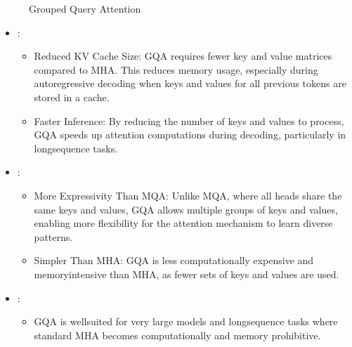 \documentclass[letterpaper,11pt,english]{sphinxmanual}
\begin{document}
\begin{figure}[htbp]
\centering
\capstart

\noindent{}
\caption{Grouped Query Attention}\label{\detokenize{pretraining:id21}}\end{figure}

\sphinxAtStartPar
{}
\begin{itemize}
\item {} 
\sphinxAtStartPar
{}:
\begin{itemize}
\item {} 
\sphinxAtStartPar
Reduced KV Cache Size: GQA requires fewer key and value matrices
compared to MHA. This reduces memory usage, especially during
autoregressive decoding when keys and values for all previous tokens
are stored in a cache.

\item {} 
\sphinxAtStartPar
Faster Inference: By reducing the number of keys and values to
process, GQA speeds up attention computations during decoding,
particularly in long\sphinxhyphen{}sequence tasks.

\end{itemize}

\item {} 
\sphinxAtStartPar
{}:
\begin{itemize}
\item {} 
\sphinxAtStartPar
More Expressivity Than MQA: Unlike MQA, where all heads share the
same keys and values, GQA allows multiple groups of keys and values,
enabling more flexibility for the attention mechanism to learn
diverse patterns.

\item {} 
\sphinxAtStartPar
Simpler Than MHA: GQA is less computationally expensive and
memory\sphinxhyphen{}intensive than MHA, as fewer sets of keys and values are
used.

\end{itemize}

\item {} 
\sphinxAtStartPar
{}:
\begin{itemize}
\item {} 
\sphinxAtStartPar
GQA is well\sphinxhyphen{}suited for very large models and long\sphinxhyphen{}sequence tasks
where standard MHA becomes computationally and memory prohibitive.

\end{itemize}

\end{itemize}
\end{document}
